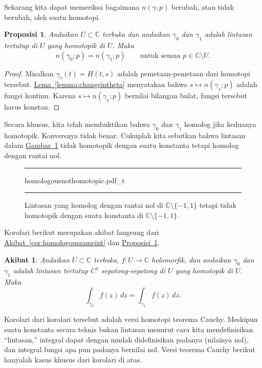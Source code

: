\documentclass[12pt,openany]{book}
\newcommand{\C}{{\mathbb{C}}}
\newcommand{\myquote}[1]{``#1''}
\theoremstyle{plain}
\newtheorem{prop}[thm]{Proposisi}
\newtheorem{cor}[thm]{Akibat}
\theoremstyle{remark}
\theoremstyle{definition}
\newenvironment{myfig}{%
\begin{figure}[h!t]
\noindent\rule{\textwidth}{0.5pt}\vspace{12pt}\par\centering}%
{\par\noindent\rule{\textwidth}{0.5pt}
\end{figure}}
\theoremstyle{exercise}
\theoremstyle{example}
\newcommand{\figureref}[1]{\hyperref[#1]{Gambar~\ref*{#1}}}
\newcommand{\propref}[1]{\hyperref[#1]{Proposisi~\ref*{#1}}}
\newcommand{\lemmaref}[1]{\hyperref[#1]{Lema~\ref*{#1}}}
\newcommand{\corref}[1]{\hyperref[#1]{Akibat~\ref*{#1}}}
\begin{document}
Sekarang kita dapat memeriksa bagaimana $n(\gamma;p)$ berubah, atau tidak berubah, oleh suatu homotopi.

\begin{prop} \label{prop:homotopicmeanshomologous}
Andaikan $U \subset \C$ terbuka dan andaikan $\gamma_0$ dan $\gamma_1$ adalah lintasan
tertutup di $U$ yang homotopik di $U$. Maka
\begin{equation*}
n(\gamma_0;p) = n(\gamma_1;p) \qquad \text{untuk semua } p \in \C \setminus U .
\end{equation*}
\end{prop}

\begin{proof}
Misalkan $\gamma_s(t) = H(t,s)$ adalah pemetaan-pemetaan dari homotopi tersebut.
\lemmaref{lemma:changeintheta} menyatakan bahwa $s \mapsto n(\gamma_s;p)$ adalah
fungsi kontinu. Karena $s \mapsto n(\gamma_s;p)$ bernilai bilangan bulat, fungsi tersebut harus
konstan.
\end{proof}

Secara khusus, kita telah membuktikan bahwa $\gamma_0$ dan $\gamma_1$ homolog jika
keduanya homotopik. Konversnya tidak benar. Cukuplah kita sebutkan bahwa 
lintasan dalam \figureref{fig:homologousnothomotopic} 
tidak homotopik dengan suatu konstanta tetapi homolog dengan rantai nol.

\begin{myfig}
{homologousnothomotopic.pdf_t}
\caption{Lintasan yang homolog dengan rantai nol di $\C \setminus \{
-1,1\}$ tetapi tidak homotopik dengan suatu konstanta di
$\C \setminus \{ -1,1 \}$.\label{fig:homologousnothomotopic}}
\end{myfig}

Korolari berikut merupakan akibat langsung
dari \corref{cor:homologoussameint} dan
\propref{prop:homotopicmeanshomologous}.

\begin{cor}
Andaikan $U \subset \C$ terbuka, $f \colon U \to \C$ holomorfik,
dan andaikan $\gamma_0$ dan $\gamma_1$ adalah lintasan tertutup
$C^1$ sepotong-sepotong di $U$ yang homotopik di $U$. Maka
\begin{equation*}
\int_{\gamma_0} f(z) \, dz = \int_{\gamma_1} f(z) \, dz .
\end{equation*}
\end{cor}

Korolari dari korolari tersebut adalah versi homotopi teorema Cauchy.
Meskipun suatu konstanta secara teknis bukan lintasan menurut cara kita mendefinisikan
\myquote{lintasan,} integral dapat dengan mudah didefinisikan padanya (nilainya nol),
dan integral fungsi apa pun padanya bernilai nol.
Versi teorema Cauchy berikut
hanyalah kasus khusus dari korolari di atas.
\end{document}
